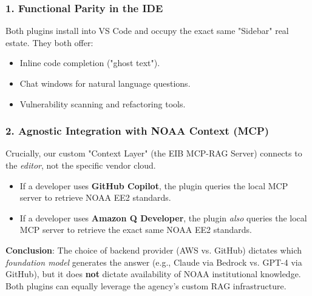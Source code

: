 \documentclass[10pt]{article}
\begin{document}
\vspace{1em}
\noindent{}

\vspace{1em}

\subsubsection*{1. Functional Parity in the IDE}
Both plugins install into VS Code and occupy the exact same "Sidebar" real estate. They both offer:
\begin{itemize}[nosep, topsep=2pt, leftmargin=1.5em]
    \item Inline code completion ("ghost text").
    \item Chat windows for natural language questions.
    \item Vulnerability scanning and refactoring tools.
\end{itemize}

\subsubsection*{2. Agnostic Integration with NOAA Context (MCP)}
Crucially, our custom "Context Layer" (the EIB MCP-RAG Server) connects to the \textit{editor}, not the specific vendor cloud.

\begin{itemize}[nosep, topsep=2pt, leftmargin=1.5em]
    \item If a developer uses \textbf{GitHub Copilot}, the plugin queries the local MCP server to retrieve NOAA EE2 standards.
    \item If a developer uses \textbf{Amazon Q Developer}, the plugin \textit{also} queries the local MCP server to retrieve the exact same NOAA EE2 standards.
\end{itemize}

\vspace{1em}
\textbf{Conclusion}: The choice of backend provider (AWS vs. GitHub) dictates which \textit{foundation model} generates the answer (e.g., Claude via Bedrock vs. GPT-4 via GitHub), but it does \textbf{not} dictate availability of NOAA institutional knowledge. Both plugins can equally leverage the agency's custom RAG infrastructure.
\end{document}
